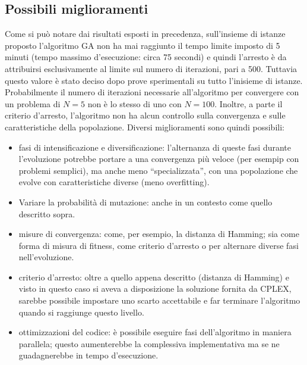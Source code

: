 \subsection{Possibili miglioramenti}\label{subsec:miglioramenti-ga}
Come si può notare dai risultati esposti in precedenza, sull'insieme di istanze proposto l'algoritmo GA
non ha mai raggiunto il tempo limite imposto di 5 minuti (tempo massimo d'esecuzione: circa 75 secondi)
e quindi l'arresto è da attribuirsi esclusivamente al limite sul numero di iterazioni, pari a 500.
Tuttavia questo valore è stato deciso dopo prove sperimentali su tutto l'inisieme di istanze.
Probabilmente il numero di iterazioni necessarie all'algoritmo per convergere con un problema di $N=5$ non
è lo stesso di uno con $N=100$.
Inoltre, a parte il criterio d'arresto, l'algoritmo non ha alcun controllo sulla convergenza
e sulle caratteristiche della popolazione.
Diversi miglioramenti sono quindi possibili:
\begin{itemize}
	\item fasi di intensificazione e diversificazione: l'alternanza di queste fasi durante l'evoluzione
	potrebbe portare a una convergenza più veloce (per esempip con problemi semplici), ma anche
	meno ``specializzata'', con una popolazione che evolve con caratteristiche diverse (meno overfitting).
	\item Variare la probabilità di mutazione: anche in un contesto come quello descritto sopra.
	\item misure di convergenza: come, per esempio, la distanza di Hamming; sia come forma di misura
	di fitness, come criterio d'arresto o per alternare diverse fasi nell'evoluzione.
	\item criterio d'arresto: oltre a quello appena descritto (distanza di Hamming) e visto in questo
	caso si aveva a disposizione la soluzione fornita da CPLEX, sarebbe possibile impostare uno scarto accettabile
	e far terminare l'algoritmo quando si raggiunge questo livello.
	\item ottimizzazioni del codice: è possibile eseguire fasi dell'algoritmo in maniera parallela; questo
	aumenterebbe la complessiva implementativa ma se ne guadagnerebbe in tempo d'esecuzione.
\end{itemize}
